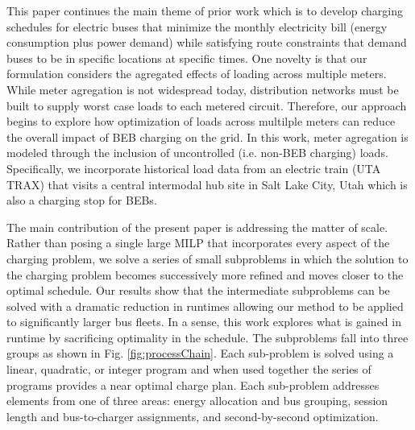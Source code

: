 \par This paper continues the main theme of prior work which is to develop charging schedules for electric buses that minimize the monthly electricity bill (energy consumption plus power demand) while satisfying route constraints that demand buses to be in specific locations at specific times.  One novelty is that our formulation considers the agregated effects of loading across multiple meters.  While meter agregation is not widespread today, distribution networks must be built to supply worst case loads to each metered circuit.  Therefore, our approach begins to explore how optimization of loads across multilple meters can reduce the overall impact of BEB charging on the grid.  In this work, meter agregation is modeled through the inclusion of uncontrolled (i.e. non-BEB charging) loads.  Specifically, we incorporate historical load data from an electric train (UTA TRAX) that visits a central intermodal hub site in Salt Lake City, Utah which is also a charging stop for BEBs.  
\par The main contribution of the present paper is addressing the matter of scale.  Rather than posing a single large MILP that incorporates every aspect of the charging problem, we solve a series of small subproblems in which the solution to the charging problem becomes successively more refined and moves closer to the optimal schedule.  Our results show that the intermediate subproblems can be solved with a dramatic reduction in runtimes allowing our method to be applied to significantly larger bus fleets.  In a sense, this work explores what is gained in runtime by sacrificing optimality in the schedule.  The subproblems fall into three groups as shown in Fig. \ref{fig:processChain}.  Each sub-problem is solved using a linear, quadratic, or integer program and when used together the series of programs provides a near optimal charge plan. Each sub-problem addresses elements from one of three areas: energy allocation and bus grouping, session length and bus-to-charger assignments, and second-by-second optimization.  


